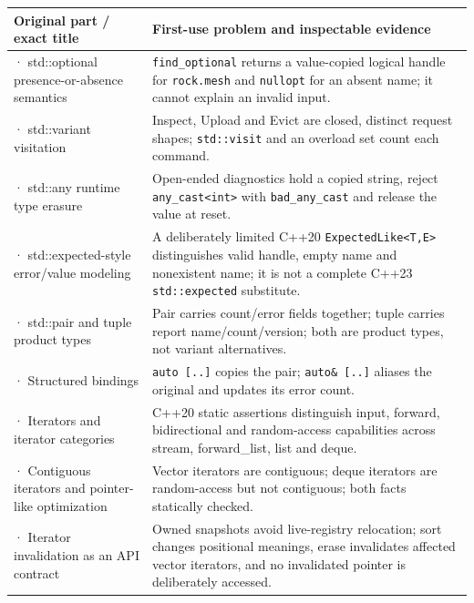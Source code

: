 {\def\LTcaptype{none} %
\begin{longtable}[]{@{}
  >{\raggedright\arraybackslash}p{}
  >{\raggedright\arraybackslash}p{}@{}}
\toprule\noalign{}
\begin{minipage}[b]{\linewidth}\raggedright
Original part / exact title
\end{minipage} & \begin{minipage}[b]{\linewidth}\raggedright
First-use problem and inspectable evidence
\end{minipage} \\
\midrule\noalign{}
\endhead
\bottomrule\noalign{}
\endlastfoot
251 · std::optional presence-or-absence semantics & \texttt{find\_optional} returns a value-copied logical handle for \texttt{rock.mesh} and \texttt{nullopt} for an absent name; it cannot explain an invalid input. \\
252 · std::variant visitation & Inspect, Upload and Evict are closed, distinct request shapes; \texttt{std::visit} and an overload set count each command. \\
253 · std::any runtime type erasure & Open-ended diagnostics hold a copied string, reject \texttt{any\_cast\textless{}int\textgreater{}} with \texttt{bad\_any\_cast} and release the value at reset. \\
254 · std::expected-style error/value modeling & A deliberately limited C++20 \texttt{ExpectedLike\textless{}T,E\textgreater{}} distinguishes valid handle, empty name and nonexistent name; it is not a complete C++23 \texttt{std::expected} substitute. \\
255 · std::pair and tuple product types & Pair carries count/error fields together; tuple carries report name/count/version; both are product types, not variant alternatives. \\
256 · Structured bindings & \texttt{auto\ {[}..{]}} copies the pair; \texttt{auto\&\ {[}..{]}} aliases the original and updates its error count. \\
257 · Iterators and iterator categories & C++20 static assertions distinguish input, forward, bidirectional and random-access capabilities across stream, forward\_list, list and deque. \\
258 · Contiguous iterators and pointer-like optimization & Vector iterators are contiguous; deque iterators are random-access but not contiguous; both facts statically checked. \\
259 · Iterator invalidation as an API contract & Owned snapshots avoid live-registry relocation; sort changes positional meanings, erase invalidates affected vector iterators, and no invalidated pointer is deliberately accessed. \\

\end{longtable}}
